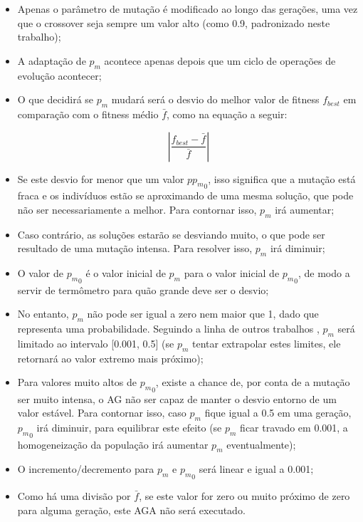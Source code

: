 \begin{itemize}

	\item Apenas o parâmetro de mutação é modificado ao longo das gerações, uma vez que o crossover seja sempre um valor alto (como 0.9, padronizado neste trabalho);

	\item A adaptação de $p_m$ acontece apenas depois que um ciclo de operações de evolução acontecer;

	\item O que decidirá se $p_m$ mudará será o desvio do melhor valor de fitness $f_{best}$ em comparação com o fitness médio $\bar{f}$, como na equação a seguir:

\begin{equation}
	\left| \frac{f_{best} - \bar{f}}{\bar{f}} \right|
\label{eq:aga}
\end{equation}

	\item Se este desvio for menor que um valor $p{p_m}_0$, isso significa que a mutação está fraca e os indivíduos estão se aproximando de uma mesma solução, que pode não ser necessariamente a melhor. Para contornar isso, $p_m$ irá aumentar;

	\item Caso contrário, as soluções estarão se desviando muito, o que pode ser resultado de uma mutação intensa. Para resolver isso, $p_m$ irá diminuir;

	\item O valor de ${p_m}_0$ é o valor inicial de $p_m$ para o valor inicial de ${p_m}_0$, de modo a servir de termômetro para quão grande deve ser o desvio;

	\item No entanto, $p_m$ não pode ser igual a zero nem maior que 1, dado que representa uma probabilidade. Seguindo a linha de outros trabalhos \cite{matthias2013variable}, $p_m$ será limitado ao intervalo [0.001, 0.5] (se $p_m$ tentar extrapolar estes limites, ele retornará ao valor extremo mais próximo);

	\item Para valores muito altos de ${p_m}_0$, existe a chance de, por conta de a mutação ser muito intensa, o AG não ser capaz de manter o desvio entorno de um valor estável. Para contornar isso, caso $p_m$ fique igual a 0.5 em uma geração, ${p_m}_0$ irá diminuir, para equilibrar este efeito (se $p_m$ ficar travado em 0.001, a homogeneização da população irá aumentar $p_m$ eventualmente);

	\item O incremento/decremento para $p_m$ e ${p_m}_0$ será linear e igual a 0.001;

	\item Como há uma divisão por $\bar{f}$, se este valor for zero ou muito próximo de zero para alguma geração, este AGA não será executado.

\end{itemize}

